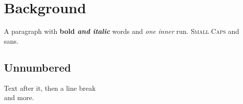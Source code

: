 \chapter{Background}
\label{ch:bg}

A paragraph with \textbf{bold \textit{and italic}} words and \emph{one \emph{inner}} run.
\textsc{Small Caps} and \textsf{sans}.

\section*{Unnumbered}
Text after it, then a line break\\ and more.
